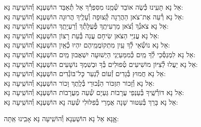 \documentclass[twoside, openany, parskip=half, 11pt]{book}
\begin{document}
\begin{small}
אֵל נָא תָּעִֽינוּ כְּ֯שֶׂה אוֹבֵד שְׁ֯מֵֽנוּ מִסִּפְרְ֯ךָ אַל תְּ֯אַבֵּד \hfill הוֹשַׁעְנָא וְ֯הוֹשִֽׁיעָה נָּא: \\
אֵל נָא רְ֯עֵה אֶת־צֹאן הַהֲרֵגָה קְ֯צוּפָה וְ֯עָלֶֽיךָ הֲרוּגָה \hfill הוֹשַׁעְנָא וְ֯הוֹשִֽׁיעָה נָּא:\\
אֵל נָא צֹאנְ֯ךָ וְ֯צֹאן מַרְעִיתֶֽךָ פְּ֯עֻלָּתְ֯ךָ וְ֯רַעְיָתֶֽךָ \hfill הוֹשַׁעְנָא וְ֯הוֹשִֽׁיעָה נָּא:\\
אֵל נָא עֲנִיֵּי הַצֹּאן שִׂיחָם עֲנֵה בְּ֯עֵת רָצוֹן \hfill הוֹשַׁעְנָא וְ֯הוֹשִֽׁיעָה נָּא:\\
אֵל נָא נוֹשְׂ֯אֵי לְ֯ךָ עַֽיִן מִתְקוֹמֲמֵֽיהֶם יִהְיוּ כְ֯אַֽיִן \hfill הוֹשַׁעְנָא וְ֯הוֹשִֽׁיעָה נָּא:\\
אֵל נָא לִמְנַסְּ֯כֵי לְ֯ךָ מַֽיִם כְּ֯מִמַּעַיְנֵי הַיְשׁוּעָה יִשְׁאֲבוּן מַֽיִם \hfill הוֹשַׁעְנָא וְ֯הוֹשִֽׁיעָה נָּא:\\
אֵל נָא יַעֲלוּ לְ֯צִיּוֹן מוֹשִׁיעִים טְ֯פוּלִים בְּ֯ךָ וּבְשִׁמְךָ נוֹשָׁעִים \hfill הוֹשַׁעְנָא וְ֯הוֹשִֽׁיעָה נָּא:\\
אֵל נָא חֲמוּץ בְּ֯גָדִים זְ֯עוֹם לְ֯נַעֵר כׇּל־בּוֹגְ֯דִים \hfill הוֹשַׁעְנָא וְ֯הוֹשִֽׁיעָה נָּא:\\
אֵל נָא וְ֯זָכוֹר תִּזְכּוֹר הַנְּ֯כוּרֵי בְּ֯לֶֽתֶךְ וָכוֹר \hfill הוֹשַׁעְנָא וְ֯הוֹשִֽׁיעָה נָּא:\\
אֵל נָא דּוֹרְ֯שֶֽׁיךָ בְּ֯עַנְפֵי עֲרָבוֹת גַּעְיָם שְׁ֯עֵה מֵעֲרָבוֹת \hfill הוֹשַׁעְנָא וְ֯הוֹשִֽׁיעָה נָּא:\\
אֵל נָא בָּרֵךְ בְּ֯עִטּוּר שָׁנָה אֲמָרַי בְּ֯פִלּוּלִי שְׁ֯עֵה נָא \hfill הוֹשַׁעְנָא וְ֯הוֹשִֽׁיעָה נָּא:

\end{small}

\begin{large}
\shatzvkahal
אׇׇנָּא אֵל נָא הוֹשַׁעְנָא וְ֯הוֹשִֽׁיעָה נָּא אָבִֽינוּ אַֽתָּה:

\end{large}
\end{document}

